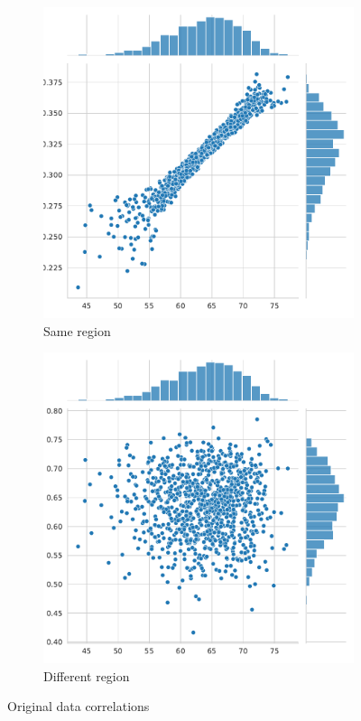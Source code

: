 \documentclass[11pt,a4paper]{article}
\numberwithin{equation}{section}
\begin{document}
\begin{figure}[htbp]
\centering
\begin{subfigure}{0.45\textwidth}
\includegraphics[width=\textwidth]{../output/jointplot_same_region.pdf}
\caption{Same region}
\label{fig:gen_corr_same}
\end{subfigure}%
\begin{subfigure}{0.45\textwidth}
\includegraphics[width=\textwidth]{../output/jointplot_different_region.pdf}
\caption{Different region}
\label{fig:gen_corr_diff}
\end{subfigure}
\caption{Original data correlations}
\end{figure}
\end{document}
